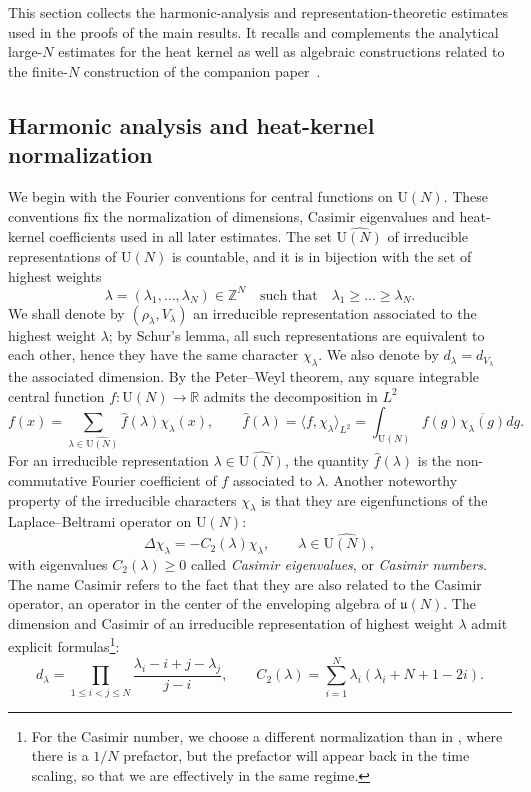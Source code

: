 \documentclass[11pt,a4paper,reqno]{amsart}
\theoremstyle{definition}
\theoremstyle{remark}
\newcommand\U{{\mathrm U}}
\newcommand\Z{{\mathbb{Z}}}
\newcommand\R{{\mathbb R}}
\begin{document}
This section collects the harmonic-analysis and representation-theoretic estimates used in the proofs of the main results. It recalls and complements the analytical large-$N$ estimates for the heat kernel \cite{LemMai25,LM2} as well as algebraic constructions related to the finite-$N$ construction of the companion paper~\cite{Lem26a}.

\subsection{Harmonic analysis and heat-kernel normalization}

We begin with the Fourier conventions for central functions on $\U(N)$. These conventions fix the normalization of dimensions, Casimir eigenvalues and heat-kernel coefficients used in all later estimates. The set $\widehat{\U(N)}$ of irreducible representations of $\U(N)$ is countable, and it is in bijection with the set of highest weights
\[
\lambda=(\lambda_1,\ldots,\lambda_N)\in\Z^N\quad \text{such that}\quad \lambda_1\geq\ldots\geq\lambda_N.
\]
We shall denote by $(\rho_\lambda,V_\lambda)$ an irreducible representation associated to the highest weight $\lambda$; by Schur's lemma, all such representations are equivalent to each other, hence they have the same character $\chi_\lambda$. We also denote by $d_\lambda=d_{V_\lambda}$ the associated dimension. By the Peter--Weyl theorem, any square integrable central function $f:\U(N)\to\R$ admits the decomposition in $L^2$
\[
f(x)=\sum_{\lambda\in\widehat{\U(N)}}\widehat{f}(\lambda)\chi_\lambda(x),\qquad \widehat{f}(\lambda)=\langle f,\chi_\lambda\rangle_{L^2}=\int_{\U(N)}f(g)\overline{\chi_\lambda(g)}dg.
\]
For an irreducible representation $\lambda\in\widehat{\U(N)}$, the quantity $\widehat{f}(\lambda)$ is the non-commutative Fourier coefficient of $f$ associated to $\lambda$. Another noteworthy property of the irreducible characters $\chi_\lambda$ is that they are eigenfunctions of the Laplace--Beltrami operator on $\U(N)$:
\begin{equation}
\Delta\chi_\lambda=-C_2(\lambda)\chi_\lambda,\qquad \lambda\in\widehat{\U(N)},
\end{equation}
with eigenvalues $C_2(\lambda)\geq 0$ called \emph{Casimir eigenvalues}, or \emph{Casimir numbers}. The name Casimir refers to the fact that they are also related to the Casimir operator, an operator in the center of the enveloping algebra of $\mathfrak u(N)$. The dimension and Casimir of an irreducible representation of highest weight $\lambda$ admit explicit formulas\footnote{For the Casimir number, we choose a different normalization than in \cite{Lem22,LemMai25,LM2}, where there is a $1/N$ prefactor, but the prefactor will appear back in the time scaling, so that we are effectively in the same regime.}:
\begin{equation}\label{eq:dim-cas}
d_\lambda=\prod_{1\leq i<j\leq N}\frac{\lambda_i-i+j-\lambda_j}{j-i},\qquad C_2(\lambda)=\sum_{i=1}^N\lambda_i(\lambda_i+N+1-2i).
\end{equation}
\end{document}
